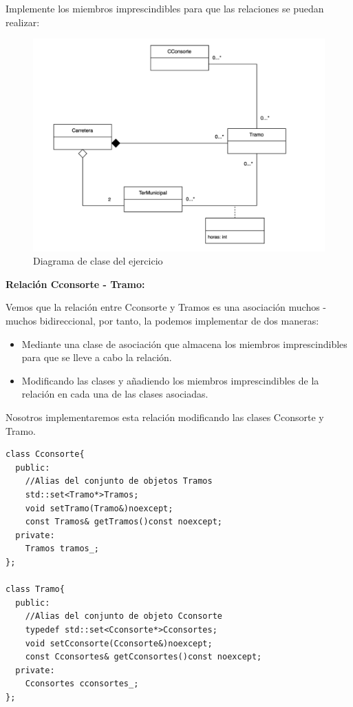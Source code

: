  Implemente los miembros imprescindibles para que las relaciones se puedan realizar:
\begin{figure}[h]
  \begin{center}
    \includegraphics[width=\textwidth]{assets/Junio2023_1.png}
  \end{center}
  \caption{Diagrama de clase del ejercicio}
\end{figure}

\textbf{Relación Cconsorte - Tramo:}

Vemos que la relación entre Cconsorte y Tramos es una asociación muchos - muchos bidireccional, por tanto, la podemos implementar de dos maneras:
\begin{itemize}
  \item Mediante una clase de asociación que almacena los miembros imprescindibles para que se lleve a cabo la relación.
  \item Modificando las clases y añadiendo los miembros imprescindibles de la relación en cada una de las clases asociadas.
\end{itemize}
Nosotros implementaremos esta relación modificando las clases Cconsorte y Tramo.

\begin{verbatim}
class Cconsorte{
  public:
    //Alias del conjunto de objetos Tramos
    std::set<Tramo*>Tramos;
    void setTramo(Tramo&)noexcept;
    const Tramos& getTramos()const noexcept;
  private:
    Tramos tramos_;
};

class Tramo{
  public:
    //Alias del conjunto de objeto Cconsorte
    typedef std::set<Cconsorte*>Cconsortes;
    void setCconsorte(Cconsorte&)noexcept;
    const Cconsortes& getCconsortes()const noexcept;
  private:
    Cconsortes cconsortes_;
};
\end{verbatim}

